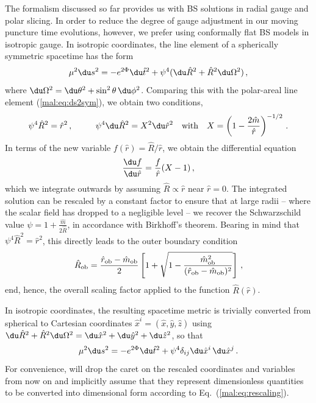 The formalism discussed so far provides us with BS solutions
in radial gauge and polar slicing. 
In order to reduce the degree of gauge
adjustment in our moving puncture time evolutions, however,
we prefer using conformally flat
BS models in isotropic gauge. In isotropic coordinates, the line
element of a spherically symmetric spacetime has the form
%
\begin{equation}
  \mu^2 \du s^2 = -e^{2\Phi}\du \hat{t}^2+\psi^4 (\du \hat{R}^2 + \hat{R}^2\du \Omega^2)\,,
  \label{mal:eq:ds2iso}
\end{equation}
%
where $\du \Omega^2=\du\theta^2+\sin^2\theta\,\du \phi^2$. Comparing this
with the polar-areal line element (\ref{mal:eq:ds2sym}), we obtain
two conditions,
%
\begin{equation}
  \psi^4 \hat{R}^2 = \hat{r}^2\,,~~~~~~~~
  \psi^4\du \hat{R}^2=
  X^2 \du \hat{r}^2~~~\text{with}~~~
  X=\left(1-\frac{2\hat{m}}{\hat{r}}\right)^{-1/2}\,.
\end{equation}
%
In terms of the new variable $f(\hat{r})=\hat{R}/\hat{r}$, we obtain the differential equation
%
\begin{equation}
  \frac{\du f}{\du \hat{r}} = \frac{f}{\hat{r}}(X-1)\,,
\end{equation}
%
which we integrate outwards by assuming $\hat{R}\propto \hat{r}$ near $\hat{r}=0$. The
integrated solution can be rescaled by a constant factor to ensure that
at large radii -- where the scalar field has dropped to a negligible level --
we recover the Schwarzschild value
$\psi = 1+\frac{\hat{m}}{2\hat{R}}$, in accordance with Birkhoff's theorem.
Bearing in mind that $\psi^4\hat{R}^2=\hat{r}^2$, this directly leads to
the outer boundary condition
%
\begin{equation}
  \hat{R}_{\rm ob} =
  \frac{\hat{r}_{\rm ob}-\hat{m}_{\rm ob}}{2}
  \left[
  1+
  \sqrt{1-\frac{\hat{m}_{\rm ob}^2}{(\hat{r}_{\rm ob}-\hat{m}_{\rm ob})^2}}
  \right]\,,
\end{equation}
%
end, hence, the overall scaling factor applied to the function $\hat{R}(\hat{r})$.

In isotropic coordinates, the resulting spacetime metric is trivially
converted from spherical to Cartesian coordinates $\hat{x}^i=(\hat{x},\hat{y},\hat{z})$ using
$\du \hat{R}^2 + \hat{R}^2\du \Omega^2=\du \hat{x}^2+\du \hat{y}^2+\du \hat{z}^2$, so that
%
\begin{equation}
  \mu^2 \du s^2 = -e^{2\Phi} \du \hat{t}^2 + \psi^4 \delta_{ij}\du \hat{x}^i \,\du \hat{x}^j
  \,.
\end{equation}
%
For convenience, will drop the caret on the rescaled coordinates
and variables from now on and implicitly assume
that they represent dimensionless quantities to be
converted into dimensional form according to
Eq.~(\ref{mal:eq:rescaling}).

